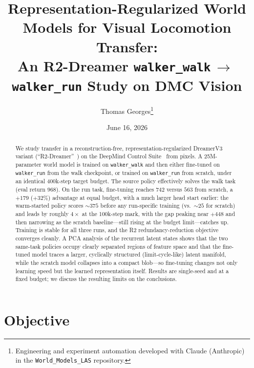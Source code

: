 \documentclass[11pt]{article}
\title{Representation-Regularized World Models for Visual Locomotion
       Transfer:\\ An R2-Dreamer \texttt{walker\_walk}\,$\rightarrow$\,\texttt{walker\_run}
       Study on DMC Vision}
\author{Thomas Georges\thanks{Engineering and experiment automation developed
        with Claude (Anthropic) in the \texttt{World\_Models\_LAS} repository.}}
\date{June 16, 2026}
\begin{document}
\maketitle

\begin{abstract}
We study transfer in a reconstruction-free, representation-regularized
DreamerV3 variant (``R2-Dreamer''~\cite{r2dreamer,dreamerv3}) on the DeepMind
Control Suite~\cite{dmc} from pixels. A 25M-parameter world model is trained on
\texttt{walker\_walk} and then either fine-tuned on \texttt{walker\_run} from the
walk checkpoint, or trained on \texttt{walker\_run} from scratch, under an
identical 400k-step target budget. The source policy effectively solves the walk
task (eval return $968$). On the run task, fine-tuning reaches $742$ versus $563$
from scratch, a $+179$ ($+32\%$) advantage at equal budget, with a much larger
head start earlier: the warm-started policy scores $\sim\!375$ before any
run-specific training (vs.\ $\sim\!25$ for scratch) and leads by roughly
$4\times$ at the 100k-step mark, with the gap peaking near $+448$ and then
narrowing as the scratch baseline---still rising at the budget limit---catches
up. Training is stable for all three runs, and the R2 redundancy-reduction
objective converges cleanly. A PCA analysis of the recurrent latent states shows
that the two same-task policies occupy clearly separated regions of feature
space and that the fine-tuned model traces a larger, cyclically structured
(limit-cycle-like) latent manifold, while the scratch model collapses into a
compact blob---so fine-tuning changes not only learning speed but the learned
representation itself. Results are single-seed and at a fixed budget; we discuss
the resulting limits on the conclusions.
\end{abstract}

\section{Objective}
\end{document}
